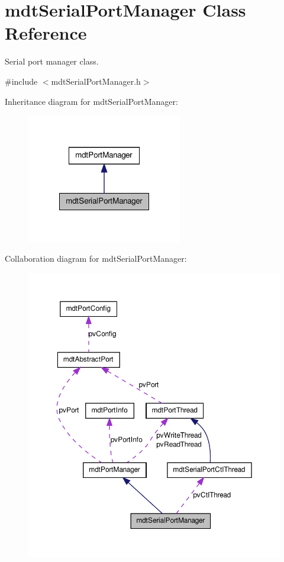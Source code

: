\hypertarget{classmdt_serial_port_manager}{
\section{mdtSerialPortManager Class Reference}
\label{classmdt_serial_port_manager}
}


Serial port manager class.  




{\ttfamily \#include $<$mdtSerialPortManager.h$>$}



Inheritance diagram for mdtSerialPortManager:\nopagebreak
\begin{figure}[H]
\begin{center}
\leavevmode
\includegraphics[width=192pt]{classmdt_serial_port_manager__inherit__graph}
\end{center}
\end{figure}


Collaboration diagram for mdtSerialPortManager:\nopagebreak
\begin{figure}[H]
\begin{center}
\leavevmode
\includegraphics[width=355pt]{classmdt_serial_port_manager__coll__graph}
\end{center}
\end{figure}
